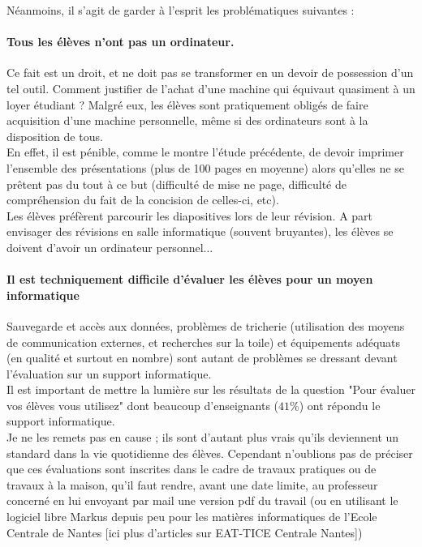 \documentclass[a4paper,11pt,french]{report}
\begin{document}
Néanmoins, il s'agit de garder à l'esprit les problématiques suivantes :

\paragraph{Tous les élèves n'ont pas un ordinateur.}
Ce fait est un droit, et ne doit pas se transformer en un devoir de possession d'un tel outil. Comment justifier de l'achat d'une machine qui équivaut quasiment à un loyer étudiant ? Malgré eux, les élèves sont pratiquement obligés de faire acquisition d'une machine personnelle, même si des ordinateurs sont à la disposition de tous.\\

En effet, il est pénible, comme le montre l'étude précédente, de devoir imprimer l'ensemble des présentations (plus de 100 pages en moyenne) alors qu'elles ne se prêtent pas du tout à ce but (difficulté de mise ne page, difficulté de compréhension du fait de la concision de celles-ci, etc).\\

Les élèves préfèrent parcourir les diapositives lors de leur révision. A part envisager des révisions en salle informatique (souvent bruyantes), les élèves se doivent d'avoir un ordinateur personnel...\\

\paragraph{Il est techniquement difficile d'évaluer les élèves pour un moyen informatique}
Sauvegarde et accès aux données, problèmes de tricherie (utilisation des moyens de communication externes, et recherches sur la toile) et équipements adéquats (en qualité et surtout en nombre) sont autant de problèmes se dressant devant l'évaluation sur un support informatique.\\

Il est important de mettre la lumière sur les résultats de la question "Pour évaluer vos élèves vous utilisez" dont beaucoup d'enseignants ($41\%$) ont répondu le support informatique.\\

Je ne les remets pas en cause ; ils sont d'autant plus vrais qu'ils deviennent un standard dans la vie quotidienne des élèves. Cependant n'oublions pas de préciser que ces évaluations sont inscrites dans le cadre de travaux pratiques ou de travaux à la maison, qu'il faut rendre, avant une date limite, au professeur concerné en lui envoyant par mail une version pdf du travail (ou en utilisant le logiciel libre Markus depuis peu pour les matières informatiques de l'Ecole Centrale de Nantes [ici plus d'articles sur EAT-TICE Centrale Nantes])\\
\end{document}
